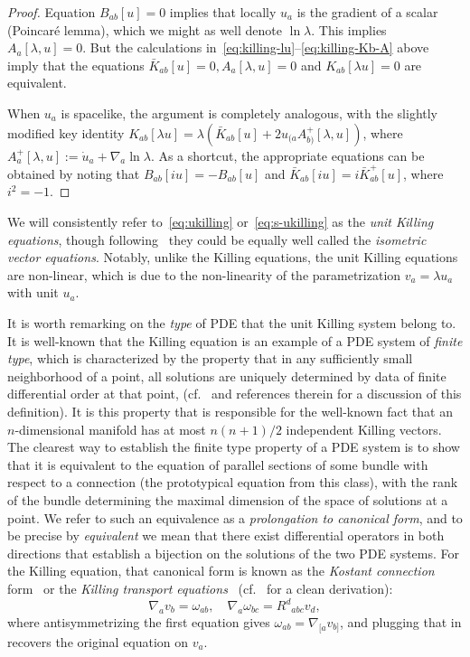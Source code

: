 \documentclass[a4paper]{article}
\theoremstyle{remark}
\newcommand{\la}{\lambda}
\begin{document}
\begin{proof}
Equation $B_{ab}[u] = 0$ implies that locally $u_a$ is the gradient of a
scalar (Poincar\'e lemma), which we might as well denote $\ln\la$.
This implies $A_a[\la, u] = 0$. But the calculations
in~\eqref{eq:killing-lu}--\eqref{eq:killing-Kb-A} above imply that the
equations $\bar{K}_{ab}[u] = 0, A_a[\la, u] = 0$ and $K_{ab}[\la
u] = 0$ are equivalent.

When $u_a$ is spacelike, the argument is completely analogous, with the
slightly modified key identity $K_{ab}[\la u] = \la (\bar{K}_{ab}[u] + 2
u_{(a} A^+_{b)}[\la,u])$, where $A^+_a[\la,u] := \dot{u}_a +
\nabla_a \ln\la$. As a shortcut, the appropriate equations can be
obtained by noting that $B_{ab}[iu] = -B_{ab}[u]$ and $\bar{K}_{ab}[iu]
= i\bar{K}^+_{ab}[u]$, where $i^2=-1$.
\end{proof}

We will consistently refer to~\eqref{eq:ukilling}
or~\eqref{eq:s-ukilling} as the \emph{unit Killing equations}, though
following~\cite[(vi)]{ehlers-mech} they could be equally
well called the \emph{isometric vector equations}. Notably, unlike the
Killing equations, the unit Killing equations are non-linear, which is
due to the non-linearity of the parametrization $v_a = \lambda u_a$ with
unit $u_a$.

It is worth remarking on the \emph{type} of PDE that the unit Killing
system belong to. It is well-known that the Killing equation is an
example of a PDE system of \emph{finite type}, which is characterized by
the property that in any sufficiently small neighborhood of a point, all
solutions are uniquely determined by data of finite differential order
at that point, (cf.~\cite[Def.7, App.A]{kh-compat} and references
therein for a discussion of this definition). It is this property that
is responsible for the well-known fact that an $n$-dimensional manifold
has at most $n(n+1)/2$ independent Killing vectors. The clearest way to
establish the finite type property of a PDE system is to show that it is
equivalent to the equation of parallel sections of some bundle with
respect to a connection (the prototypical equation from this class),
with the rank of the bundle determining the maximal dimension of the
space of solutions at a point. We refer to such an equivalence as a
\emph{prolongation to canonical form}, and to be precise by
\emph{equivalent} we mean that there exist differential operators in
both directions that establish a bijection on the solutions of the two
PDE systems. For the Killing equation, that canonical form is known as
the \emph{Kostant connection} form~\cite{kostant} or the \emph{Killing
transport equations}~\cite{geroch} (cf.~\cite[Sec.3]{kh-compat} for a
clean derivation):
\begin{equation} \label{eq:cankilling}
	\nabla_a v_b = \omega_{ab}, \quad
	\nabla_a \omega_{bc} = R^d{}_{abc} v_d ,
\end{equation}
where antisymmetrizing the first equation gives $\omega_{ab} =
\nabla_{[a} v_{b]}$, and plugging that in recovers the original equation
on $v_a$.
\end{document}
